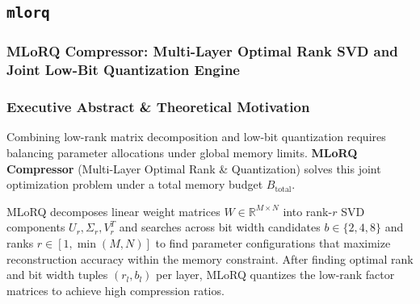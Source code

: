 \subsection{\texttt{mlorq}}
\subsubsection*{MLoRQ Compressor: Multi-Layer Optimal Rank SVD and Joint Low-Bit Quantization Engine}

\subsubsection*{Executive Abstract \& Theoretical Motivation}

Combining low-rank matrix decomposition and low-bit quantization requires balancing parameter allocations under global memory limits. \textbf{MLoRQ Compressor} (Multi-Layer Optimal Rank \& Quantization) solves this joint optimization problem under a total memory budget $B_{\text{total}}$.

MLoRQ decomposes linear weight matrices $W \in \mathbb{R}^{M \times N}$ into rank-$r$ SVD components $U_r, \Sigma_r, V_r^T$ and searches across bit width candidates $b \in \{2, 4, 8\}$ and ranks $r \in [1, \min(M, N)]$ to find parameter configurations that maximize reconstruction accuracy within the memory constraint. After finding optimal rank and bit width tuples $(r_l, b_l)$ per layer, MLoRQ quantizes the low-rank factor matrices to achieve high compression ratios.

